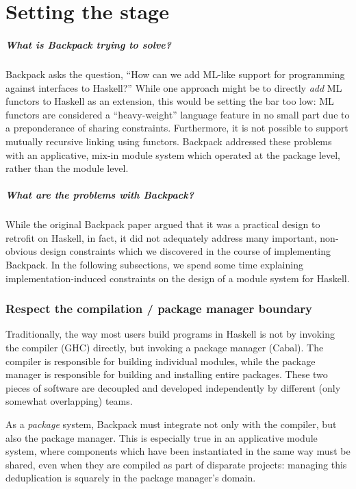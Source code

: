 \chapter{Setting the stage}

\paragraph{What is Backpack trying to solve?} Backpack asks the
question, ``How can we add ML-like support for programming against
interfaces to Haskell?''  While one approach might be to directly
\emph{add} ML functors to Haskell as an extension,  this would be setting the bar too low:
ML functors are considered a ``heavy-weight'' language feature in no
small part due to a preponderance of sharing constraints.  Furthermore,
it is not possible to support mutually recursive linking using functors.
Backpack addressed these problems with an applicative, mix-in module
system which operated at the package level, rather than the module
level.

\paragraph{What are the problems with Backpack?}  While the original
Backpack paper argued that it was a practical design to retrofit on
Haskell, in fact, it did not adequately address many important,
non-obvious design constraints which we discovered in the course of implementing
Backpack.  In the following subsections, we spend some time
explaining implementation-induced constraints on the design of a
module system for Haskell.

\subsection{Respect the compilation / package manager boundary}

Traditionally, the way most users build programs in Haskell is not by
invoking the compiler (GHC) directly, but invoking a package manager
(Cabal).  The compiler is responsible for building individual modules,
while the package manager is responsible for building and installing
entire packages.  These two pieces of software are decoupled and
developed independently by different (only somewhat overlapping) teams.

As a \emph{package} system, Backpack must integrate not only with
the compiler, but also the package manager.  This is especially true
in an applicative module system, where components which have been
instantiated in the same way must be shared, even when they are compiled
as part of disparate projects: managing this deduplication is squarely
in the package manager's domain.

